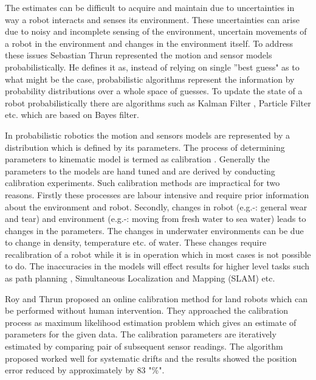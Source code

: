 \documentclass[12pt]{dalcsthesis}
\begin{document}
The estimates can be difficult to acquire and maintain due to uncertainties in way a robot interacts and senses its environment. These uncertainties can arise due to noisy and incomplete sensing of the environment, uncertain movements of a robot in the environment and changes in the environment itself.  To address these issues Sebastian Thrun \cite{thrun2005probabilistic} represented the motion and sensor models probabilistically. He defines it as, instead of relying on single ''best guess" as to what might be the case, probabilistic algorithms represent the information by probability distributions over a whole space of guesses.  To update the state of a robot probabilistically there are algorithms such as Kalman Filter \cite{kalman1960new}, Particle Filter \cite{gordon1993novel} etc. which are based on Bayes filter. 

In probabilistic robotics the motion and sensors models are represented by a distribution which is defined by its parameters.  The process of determining parameters to kinematic model is termed as calibration \cite{cox1990autonomous} \cite{vukobratovic1989introduction}. Generally the parameters to the models are hand tuned and are derived by conducting calibration experiments. Such calibration methods are impractical for two reasons. Firstly these processes are labour intensive and require prior information about the environment and robot. Secondly, changes in robot (e.g.-:  general wear and tear) and environment (e.g.-: moving from fresh water to sea water) leads to changes in the parameters. The changes in underwater environments can be due to change in density, temperature etc. of water. These changes require recalibration of a robot while it is in operation which in most cases is not possible to do. The inaccuracies in the models will effect results for higher level tasks such as path planning \cite{Lav06}, Simultaneous Localization and 
Mapping (SLAM) \cite{thrun2005probabilistic} \cite{grisettiyz2005improving} etc.

Roy and Thrun \cite{Roy} proposed an online calibration method for land robots which can be performed without human intervention.  They approached the calibration process as maximum likelihood estimation problem which gives an estimate of parameters for the given data. The calibration parameters are iteratively estimated by comparing pair of subsequent sensor readings. The algorithm proposed worked well for systematic drifts and the results showed the position error reduced by approximately by 83 "\%".
\end{document}
